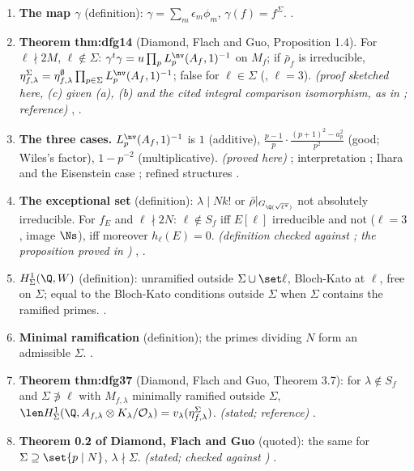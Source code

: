 \begin{enumerate}[label=\textbf{\thechapter.\arabic*}]
.
\item \textbf{The map $\gamma$} (definition): $\gamma=\sum_m\epsilon_m\phi_m$, $\gamma(f)=f^\Sigma$. .
\item \textbf{Theorem thm:dfg14} (Diamond, Flach and Guo, Proposition 1.4). For $\ell\nmid2M$, $\ell\notin\Sigma$: $\gamma^t\gamma=u\prod_pL^{\nv}_p(A_f,1)^{-1}$ on $M_f$; if $\bar\rho_f$ is irreducible,
$\eta^\Sigma_{f,\lambda}=\eta^\emptyset_{f,\lambda}\prod_{p\in\Sigma}L^{\nv}_p(A_f,1)^{-1}$; false for $\ell\in\Sigma$ (, $\ell=3$). \emph{(proof sketched here, (c) given (a), (b) and the cited integral comparison isomorphism, as in \cite[Proposition 1.4]{DFG04};
reference)} , .
\item \textbf{The three cases.} $L^{\nv}_p(A_f,1)^{-1}$ is $1$ (additive), $\frac{p-1}p\cdot\frac{(p+1)^2-a_p^2}{p^2}$ (good; Wiles's factor), $1-p^{-2}$ (multiplicative). \emph{(proved here)} ;
interpretation ; Ihara and the Eisenstein case ; refined structures .
\item \textbf{The exceptional set} (definition): $\lambda\mid Nk!$ or $\bar\rho|_{G_{\Q(\sqrt{\ell^*})}}$ not absolutely irreducible. For $f_E$ and $\ell\nmid2N$: $\ell\notin S_f$ iff $E[\ell]$ irreducible and not ($\ell=3$, image $\Ns$), iff
moreover $h_\ell(E)=0$. \emph{(definition checked against \cite{DFG04}; the proposition proved in )} , .
\item \textbf{$H^1_\Sigma(\Q,W)$} (definition): unramified outside $\Sigma\cup\set\ell$, Bloch-Kato at $\ell$, free on $\Sigma$; equal to the Bloch-Kato conditions outside $\Sigma$ when $\Sigma$ contains the ramified
primes. .
\item \textbf{Minimal ramification} (definition); the primes dividing $N$ form an admissible $\Sigma$. .
\item \textbf{Theorem thm:dfg37} (Diamond, Flach and Guo, Theorem 3.7): for $\lambda\notin S_f$ and $\Sigma\not\ni\ell$ with $M_{f,\lambda}$ minimally ramified outside $\Sigma$, $\len H^1_\Sigma(\Q,A_{f,\lambda}\otimes K_\lambda/\mathcal O_\lambda)=v_\lambda(\eta^\Sigma_{f,\lambda})$.
\emph{(stated; reference)} .
\item \textbf{Theorem 0.2 of Diamond, Flach and Guo} (quoted): the same for $\Sigma\supseteq\set{p\mid N}$, $\lambda\nmid\Sigma$. \emph{(stated; checked against \cite{DFG04})} .

\end{enumerate}
